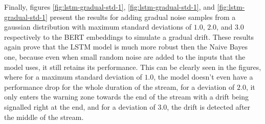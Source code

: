 \documentclass[12pt]{extreport}
\begin{document}
Finally, figures \ref{fig:lstm-gradual-std-1}, \ref{fig:lstm-gradual-std-1}, and \ref{fig:lstm-gradual-std-1} present the results for adding gradual noise samples from a gaussian distribution with maximum standard deviations of $1.0$, $2.0$, and $3.0$ respectively to the BERT embeddings to simulate a gradual drift. These results again prove that the LSTM model is much more robust then the Naive Bayes one, because even when small random noise are added to the inputs that the model uses, it still retains its performance. This can be clearly seen in the figures, where for a maximum standard deviation of $1.0$, the model doesn't even have a performance drop for the whole duration of the stream, for a deviation of $2.0$, it only enters the warning zone towards the end of the stream with a drift being signalled right at the end, and for a deviation of $3.0$, the drift is detected after the middle of the stream.
\end{document}
